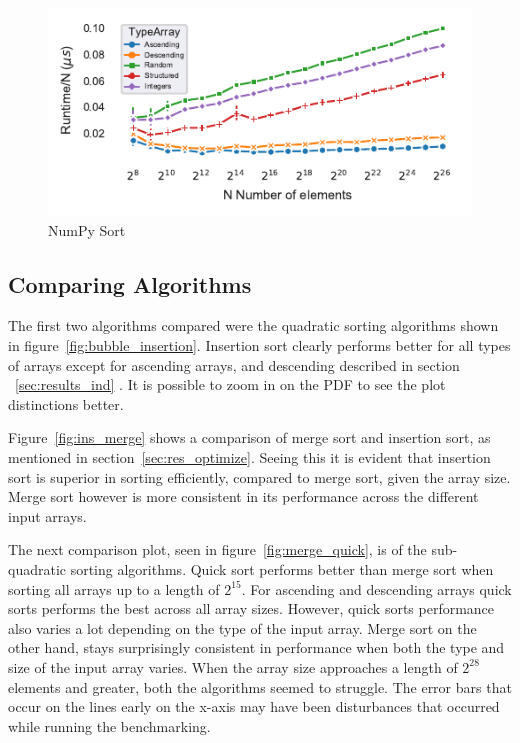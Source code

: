 \documentclass[sigconf, nonacm, natbib, screen, balance=False]{acmart}
\begin{document}
\begin{figure}[H]
  \centering
  \includegraphics[scale=0.75]{time_per_nnumpy_sort.pdf}
  \caption{NumPy Sort}
  \label{fig:time_per_nnumpy_sort}
\end{figure}

\subsection{Comparing Algorithms}\label{sec:results_comp}

The first two algorithms compared were the quadratic sorting algorithms shown in figure~\ref{fig:bubble_insertion}. Insertion sort clearly performs better for all types of arrays except for ascending arrays, and descending described in section ~\ref{sec:results_ind} . It is possible to zoom in on the PDF to see the plot distinctions better. 

Figure~\ref{fig:ins_merge} shows a comparison of merge sort and insertion sort, as mentioned in section~\ref{sec:res_optimize}. Seeing this it is evident that insertion sort is superior in sorting efficiently, compared to merge sort, given the array size. Merge sort however is more consistent in its performance across the different input arrays. 


The next comparison plot, seen in figure~\ref{fig:merge_quick}, is of the sub-quadratic sorting algorithms. Quick sort performs better than merge sort when sorting all arrays up to a length of $2^{15}$. For ascending and descending arrays quick sorts performs the best across all array sizes. However, quick sorts performance also varies a lot depending on the type of the input array. Merge sort on the other hand, stays surprisingly consistent in performance when both the type and size of the input array varies. When the array size approaches a length of $2^{28}$ elements and greater, both the algorithms seemed to struggle. The error bars that occur on the lines early on the x-axis may have been disturbances that occurred while running the benchmarking. 
\end{document}
